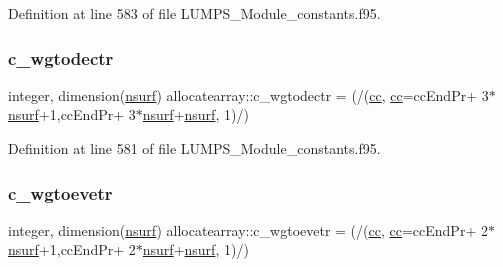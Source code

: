 Definition at line 583 of file L\+U\+M\+P\+S\+\_\+\+Module\+\_\+constants.\+f95.

\mbox{\label{namespaceallocatearray_aca67856d1d3a2188f5e3c08c9524b38e}} 
\subsubsection{\texorpdfstring{c\+\_\+wgtodectr}{c\_wgtodectr}}
{\footnotesize\ttfamily integer, dimension(\hyperlink{namespaceallocatearray_acd22f92a06f7e9a2a91426b3dc99fdb0}{nsurf}) allocatearray\+::c\+\_\+wgtodectr = (/(\hyperlink{namespaceallocatearray_ac863c81704eb507dee10f5e10741e10c}{cc}, \hyperlink{namespaceallocatearray_ac863c81704eb507dee10f5e10741e10c}{cc}=cc\+End\+Pr+ 3$\ast$\hyperlink{namespaceallocatearray_acd22f92a06f7e9a2a91426b3dc99fdb0}{nsurf}+1,cc\+End\+Pr+ 3$\ast$\hyperlink{namespaceallocatearray_acd22f92a06f7e9a2a91426b3dc99fdb0}{nsurf}+\hyperlink{namespaceallocatearray_acd22f92a06f7e9a2a91426b3dc99fdb0}{nsurf}, 1)/)}



Definition at line 581 of file L\+U\+M\+P\+S\+\_\+\+Module\+\_\+constants.\+f95.

\mbox{\label{namespaceallocatearray_a2f086ee120f80bc2dd2b68722d62a881}} 
\subsubsection{\texorpdfstring{c\+\_\+wgtoevetr}{c\_wgtoevetr}}
{\footnotesize\ttfamily integer, dimension(\hyperlink{namespaceallocatearray_acd22f92a06f7e9a2a91426b3dc99fdb0}{nsurf}) allocatearray\+::c\+\_\+wgtoevetr = (/(\hyperlink{namespaceallocatearray_ac863c81704eb507dee10f5e10741e10c}{cc}, \hyperlink{namespaceallocatearray_ac863c81704eb507dee10f5e10741e10c}{cc}=cc\+End\+Pr+ 2$\ast$\hyperlink{namespaceallocatearray_acd22f92a06f7e9a2a91426b3dc99fdb0}{nsurf}+1,cc\+End\+Pr+ 2$\ast$\hyperlink{namespaceallocatearray_acd22f92a06f7e9a2a91426b3dc99fdb0}{nsurf}+\hyperlink{namespaceallocatearray_acd22f92a06f7e9a2a91426b3dc99fdb0}{nsurf}, 1)/)}



